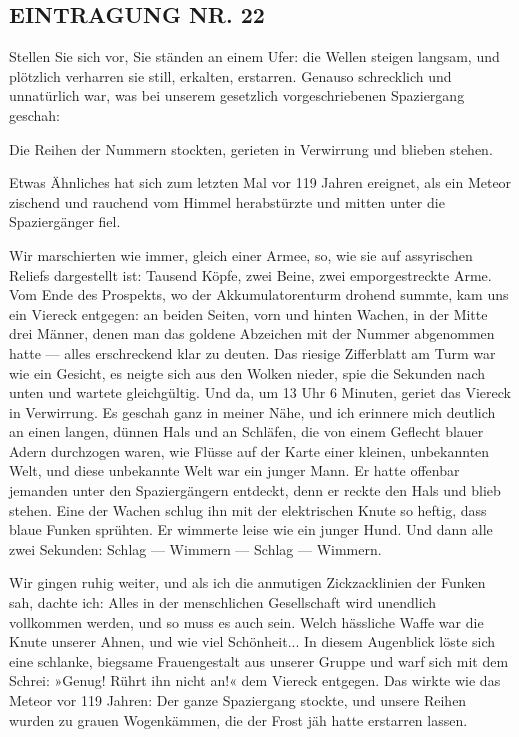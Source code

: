 \subsection{EINTRAGUNG NR. 22}

Stellen Sie sich vor, Sie ständen an einem Ufer: die Wellen steigen
langsam, und plötzlich verharren sie still, erkalten, erstarren.
Genauso schrecklich und unnatürlich war, was bei unserem gesetzlich
vorgeschriebenen Spaziergang geschah:

Die Reihen der Nummern stockten, gerieten in Verwirrung und blieben
stehen.

Etwas Ähnliches hat sich zum letzten Mal vor 119 Jahren ereignet,
als ein Meteor zischend und rauchend vom Himmel herabstürzte und
mitten unter die Spaziergänger fiel.

Wir marschierten wie immer, gleich einer Armee, so, wie sie auf
assyrischen Reliefs dargestellt ist: Tausend Köpfe, zwei Beine,
zwei emporgestreckte Arme. Vom Ende des Prospekts, wo der
Akkumulatorenturm drohend summte, kam uns ein Viereck entgegen: an
beiden Seiten, vorn und hinten Wachen, in der Mitte drei Männer,
denen man das goldene Abzeichen mit der Nummer abgenommen hatte —
alles erschreckend klar zu deuten. Das riesige Zifferblatt am Turm
war wie ein Gesicht, es neigte sich aus den Wolken nieder, spie die
Sekunden nach unten und wartete gleichgültig. Und da, um 13 Uhr 6
Minuten, geriet das Viereck in Verwirrung. Es geschah ganz in
meiner Nähe, und ich erinnere mich deutlich an einen langen, dünnen
Hals und an Schläfen, die von einem Geflecht blauer Adern
durchzogen waren, wie Flüsse auf der Karte einer kleinen,
unbekannten Welt, und diese unbekannte Welt war ein junger Mann. Er
hatte offenbar jemanden unter den Spaziergängern entdeckt, denn er
reckte den Hals und blieb stehen. Eine der Wachen schlug ihn mit
der elektrischen Knute so heftig, dass blaue Funken sprühten. Er
wimmerte leise wie ein junger Hund. Und dann alle zwei Sekunden:
Schlag — Wimmern — Schlag — Wimmern.

Wir gingen ruhig weiter, und als ich die anmutigen Zickzacklinien
der Funken sah, dachte ich: Alles in der menschlichen Gesellschaft
wird unendlich vollkommen werden, und so muss es auch sein. Welch
hässliche Waffe war die Knute unserer Ahnen, und wie viel
Schönheit... In diesem Augenblick löste sich eine schlanke,
biegsame Frauengestalt aus unserer Gruppe und warf sich mit dem
Schrei: »Genug! Rührt ihn nicht an!« dem Viereck entgegen. Das
wirkte wie das Meteor vor 119 Jahren: Der ganze Spaziergang
stockte, und unsere Reihen wurden zu grauen Wogenkämmen, die der
Frost jäh hatte erstarren lassen.

